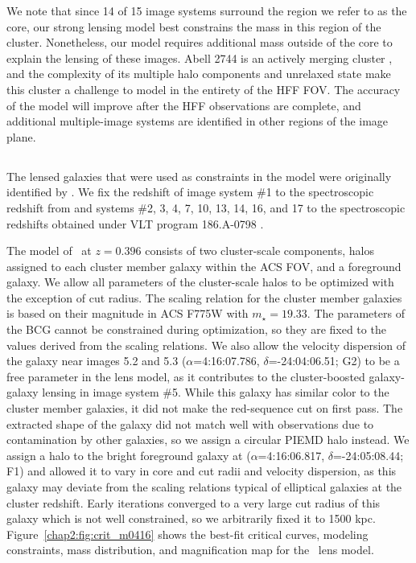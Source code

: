 We note that since 14 of 15 image systems surround the region we refer to as the core, our strong lensing model best constrains the mass in this region of the cluster. Nonetheless, our model requires additional mass outside of the core to explain the lensing of these images. Abell 2744 is an actively merging cluster \citep{Merten:2011fk}, and the complexity of its multiple halo components and unrelaxed state make this cluster a challenge to model in the entirety of the HFF FOV. The accuracy of the model will improve after the HFF observations are complete, and additional multiple-image systems are identified in other regions of the image plane.

\subsection{\MACSzerofour}

The lensed galaxies that were used as constraints in the model were originally identified by \citet[see Table \ref{app:tab:m0416_arcs} in the Appendix]{Zitrin:2013lr}. We fix the redshift of image system \#1 to the spectroscopic redshift from \citeauthor{Zitrin:2013lr} and systems \#2, 3, 4, 7, 10, 13, 14, 16, and 17 to the spectroscopic redshifts obtained under VLT program 186.A-0798 \citep{Balestra:2013uq,Grillo:2014uq}.

The model of \MACSzerofour\ at $z=0.396$ consists of two cluster-scale components, halos assigned to each cluster member galaxy within the ACS FOV, and a foreground galaxy. We allow all parameters of the cluster-scale halos to be optimized with the exception of cut radius. The scaling relation for the cluster member galaxies is based on their magnitude in ACS F775W with $m_\star=19.33$. The parameters of the BCG cannot be constrained during optimization, so they are fixed to the values derived from the scaling relations. We also allow the velocity dispersion of the galaxy near images 5.2 and 5.3 ($\alpha$=4:16:07.786, $\delta$=-24:04:06.51; G2) to be a free parameter in the lens model, as it contributes to the cluster-boosted galaxy-galaxy lensing in image system \#5. While this galaxy has similar color to the cluster member galaxies, it did not make the red-sequence cut on first pass. The extracted shape of the galaxy did not match well with observations due to contamination by other galaxies, so we assign a circular PIEMD halo instead. We assign a halo to the bright foreground galaxy at ($\alpha$=4:16:06.817, $\delta$=-24:05:08.44; F1) and allowed it to vary in core and cut radii and velocity dispersion, as this galaxy may deviate from the scaling relations typical of elliptical galaxies at the cluster redshift. Early iterations converged to a very large cut radius of this galaxy which is not well constrained, so we arbitrarily fixed it to 1500 kpc. Figure~\ref{chap2:fig:crit_m0416} shows the best-fit critical curves, modeling constraints, mass distribution, and magnification map for the \MACSzerofour\ lens model.

